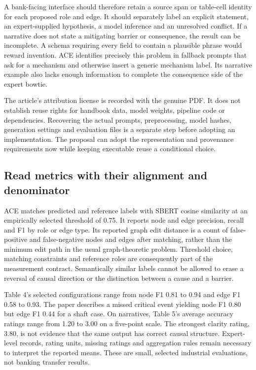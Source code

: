 A bank-facing interface should therefore retain a source span or table-cell identity for each proposed role and edge. It should separately label an explicit statement, an expert-supplied hypothesis, a model inference and an unresolved conflict. If a narrative does not state a mitigating barrier or consequence, the result can be incomplete. A schema requiring every field to contain a plausible phrase would reward invention. ACE identifies precisely this problem in fallback prompts that ask for a mechanism and otherwise insert a generic mechanism label. Its narrative example also lacks enough information to complete the consequence side of the expert bowtie.\citep{exec21_ace}

The article's attribution license is recorded with the genuine PDF. It does not establish reuse rights for handbook data, model weights, pipeline code or dependencies. Recovering the actual prompts, preprocessing, model hashes, generation settings and evaluation files is a separate step before adopting an implementation. The proposal can adopt the representation and provenance requirements now while keeping executable reuse a conditional choice.

\subsection{Read metrics with their alignment and denominator}
\label{exec21:ace-metrics}
ACE matches predicted and reference labels with SBERT cosine similarity at an empirically selected threshold of 0.75. It reports node and edge precision, recall and F1 by role or edge type. Its reported graph edit distance is a count of false-positive and false-negative nodes and edges after matching, rather than the minimum edit path in the usual graph-theoretic problem. Threshold choice, matching constraints and reference roles are consequently part of the measurement contract. Semantically similar labels cannot be allowed to erase a reversal of causal direction or the distinction between a cause and a barrier.\citep{exec21_ace}

Table 4's selected configurations range from node F1 0.81 to 0.94 and edge F1 0.58 to 0.93. The paper describes a missed critical event yielding node F1 0.80 but edge F1 0.44 for a shaft case. On narratives, Table 5's average accuracy ratings range from 1.20 to 3.00 on a five-point scale. The strongest clarity rating, 3.80, is not evidence that the same output has correct causal structure. Expert-level records, rating units, missing ratings and aggregation rules remain necessary to interpret the reported means. These are small, selected industrial evaluations, not banking transfer results.\citep{exec21_ace}


